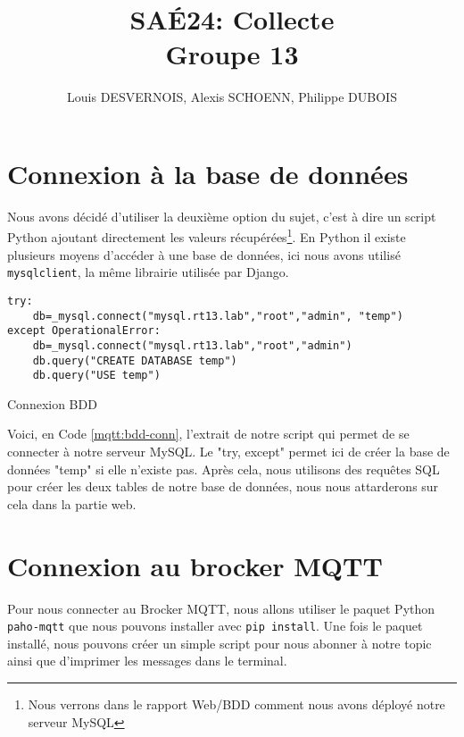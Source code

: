 \documentclass{article}
\author{Louis DESVERNOIS, Alexis SCHOENN, Philippe DUBOIS}
\title{%
    SAÉ24: Collecte \\
    \large Groupe 13}
\begin{document}
\maketitle
\tableofcontents
\listoflistings
\newpage
\section{Connexion à la base de données}
    Nous avons décidé d'utiliser la deuxième option du sujet, c'est à dire un script Python ajoutant directement les valeurs récupérées\footnote{Nous verrons dans le rapport Web/BDD comment nous avons déployé notre serveur MySQL}. 
    En Python il existe plusieurs moyens d'accéder à une base de données, ici nous avons utilisé \verb|mysqlclient|, la même librairie utilisée par Django.
    \begin{listing}[H]
        \begin{verbatim}
try:
    db=_mysql.connect("mysql.rt13.lab","root","admin", "temp")
except OperationalError:
    db=_mysql.connect("mysql.rt13.lab","root","admin")
    db.query("CREATE DATABASE temp")
    db.query("USE temp")
        \end{verbatim}
        \caption{Connexion BDD}
        \label{mqtt:bdd-conn}
    \end{listing}
    Voici, en Code \ref{mqtt:bdd-conn}, l'extrait de notre script qui permet de se connecter à notre serveur MySQL. Le "try, except" permet ici de créer la base de données "temp" si elle n'existe pas. Après cela, nous utilisons des requêtes SQL pour créer les deux tables de notre base de données, nous nous attarderons sur cela dans la partie web.
    \section{Connexion au brocker MQTT}
    Pour nous connecter au Brocker MQTT, nous allons utiliser le paquet Python \verb|paho-mqtt| que nous pouvons installer avec \verb|pip install|.
    Une fois le paquet installé, nous pouvons créer un simple script pour nous abonner à notre topic ainsi que d'imprimer les messages dans le terminal.
\end{document}
